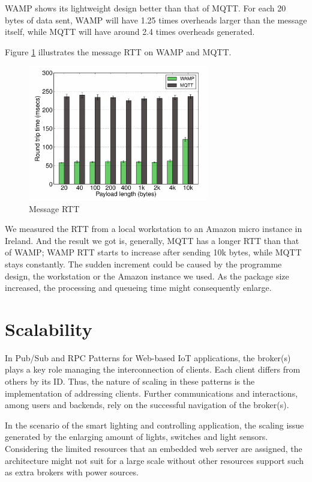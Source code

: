 WAMP shows its lightweight design better than that of MQTT. For each 20 bytes of data sent, WAMP will have 1.25 times overheads larger than the message itself, while MQTT will have around 2.4 times overheads generated. 

Figure \ref{fig:rtt} illustrates the message RTT on WAMP and MQTT.

\begin{figure}[ht]
  \begin{center}
    \includegraphics[width=0.7\textwidth]{images/rtt.pdf}
    \caption{Message RTT}
    \label{fig:rtt}
  \end{center}
\end{figure}

We measured the RTT from a local workstation to an Amazon micro instance in Ireland. And the result we got is, generally, MQTT has a longer RTT than that of WAMP; WAMP RTT starts to increase after sending 10k bytes, while MQTT stays constantly. The sudden increment could be caused by the programme design, the workstation or the Amazon instance we used. As the package size increased, the processing and queueing time might consequently enlarge. 

\section{Scalability}
In Pub/Sub and RPC Patterns for Web-based IoT applications, the broker(s) plays a key role managing the interconnection of clients. Each client differs from others by its ID. Thus, the nature of scaling in these patterns is the implementation of addressing clients. Further communications and interactions, among users and backends, rely on the successful navigation of the broker(s).

In the scenario of the smart lighting and controlling application, the scaling issue generated by the enlarging amount of lights, switches and light sensors. Considering the limited resources that an embedded web server are assigned, the architecture might not suit for a large scale without other resources support such as extra brokers with power sources.

